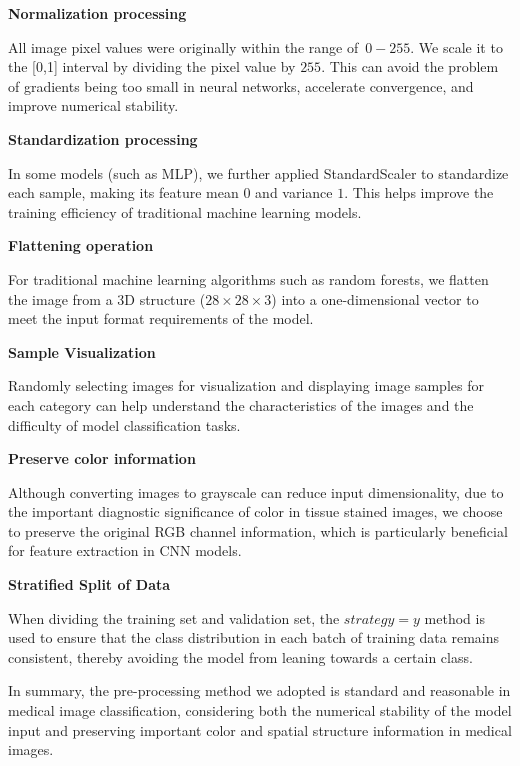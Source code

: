 \medskip

\noindent\textbf{Normalization processing}

All image pixel values were originally within the range of $\,0-255$. We scale it to the [0,1] interval by dividing the pixel value by $255$. This can avoid the problem of gradients being too small in neural networks, accelerate convergence, and improve numerical stability.

\medskip

\noindent\textbf{Standardization processing}

In some models (such as MLP), we further applied StandardScaler to standardize each sample, making its feature mean $0$ and variance $1$. This helps improve the training efficiency of traditional machine learning models.

\medskip

\noindent\textbf{Flattening operation}

For traditional machine learning algorithms such as random forests, we flatten the image from a 3D structure ($28\times28\times3$) into a one-dimensional vector to meet the input format requirements of the model.

\medskip

\noindent\textbf{Sample Visualization}

Randomly selecting images for visualization and displaying image samples for each category can help understand the characteristics of the images and the difficulty of model classification tasks.

\medskip

\noindent\textbf{Preserve color information}

Although converting images to grayscale can reduce input dimensionality, due to the important diagnostic significance of color in tissue stained images, we choose to preserve the original RGB channel information, which is particularly beneficial for feature extraction in CNN models.

\medskip

\noindent\textbf{Stratified Split of Data}

When dividing the training set and validation set, the $strategy = y$ method is used to ensure that the class distribution in each batch of training data remains consistent, thereby avoiding the model from leaning towards a certain class.

\bigskip

In summary, the pre-processing method we adopted is standard and reasonable in medical image classification, considering both the numerical stability of the model input and preserving important color and spatial structure information in medical images.